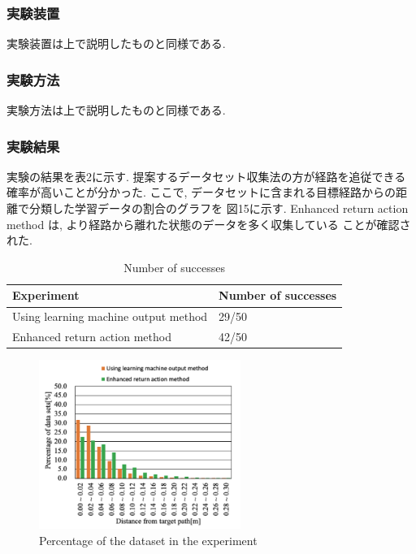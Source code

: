 \documentclass{jarticle}
\begin{document}
\subsubsection{実験装置}
実験装置は上で説明したものと同様である.

\subsubsection{実験方法}
実験方法は上で説明したものと同様である.

\subsubsection{実験結果}
実験の結果を表2に示す. 提案するデータセット収集法の方が経路を追従できる確率が高いことが分かった.
ここで, データセットに含まれる目標経路からの距離で分類した学習データの割合のグラフを
図15に示す. Enhanced return action method は, より経路から離れた状態のデータを多く収集している
ことが確認された.


\begin{table}[h!]
  \caption{Number of successes} \vspace*{2mm}\hspace*{-10mm}
    \begin{tabular}{|l|l|}
      \hline\hline
      Experiment & Number of successes \\
      \hline\hline
      Using learning machine output method & 29/50 \\
      Enhanced return action method & 42/50\\
      \hline
    \end{tabular}
\end {table}


\begin{figure}[h!]\vspace*{-5mm}
  \centering
   \includegraphics[height=55mm]{./figs/enh.png}
   \caption{Percentage of the dataset in the experiment}
\end{figure}
\end{document}

